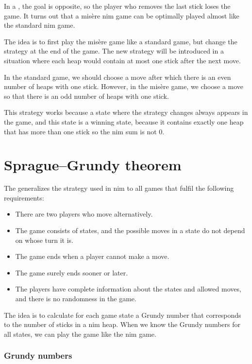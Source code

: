 
In a , the goal is opposite,
so the player who removes the last stick
loses the game.
It turns out that a misère nim game can be
optimally played almost like the standard nim game.

The idea is to first play the misère game
like a standard game, but change the strategy
at the end of the game.
The new strategy will be introduced in a situation
where each heap would contain at most one stick
after the next move.

In the standard game, we should choose a move
after which there is an even number of heaps with one stick.
However, in the misère game, we choose a move so that
there is an odd number of heaps with one stick.

This strategy works because a state where the
strategy changes always appears in the game,
and this state is a winning state, because
it contains exactly one heap that has more than one stick
so the nim sum is not 0.

\section{Sprague–Grundy theorem}


The  generalizes the
strategy used in nim to all games that fulfil
the following requirements:

\begin{itemize}[noitemsep]
\item There are two players who move alternatively.
\item The game consists of states, and the possible moves
in a state do not depend on whose turn it is.
\item The game ends when a player cannot make a move.
\item The game surely ends sooner or later.
\item The players have complete information about
the states and allowed moves, and there is no randomness in the game.
\end{itemize}
The idea is to calculate for each game state
a Grundy number that corresponds to the number of
sticks in a nim heap.
When we know the Grundy numbers for all states,
we can play the game like the nim game.

\subsubsection{Grundy numbers}

